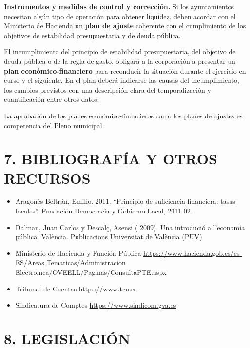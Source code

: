 \documentclass[
]{article}
\begin{document}
\textbf{Instrumentos y medidas de control y corrección.} Si los
ayuntamientos necesitan algún tipo de operación para obtener liquidez,
deben acordar con el Ministerio de Hacienda un \textbf{plan de ajuste}
coherente con el cumplimiento de los objetivos de estabilidad
presupuestaria y de deuda pública.

El incumplimiento del principio de estabilidad presupuestaria, del
objetivo de deuda pública o de la regla de gasto, obligará a la
corporación a presentar un \textbf{plan económico-financiero} para
reconducir la situación durante el ejercicio en curso y el siguiente. En
el plan deberá indicarse las causas del incumplimiento, los cambios
previstos con una descripción clara del temporalización y cuantificación
entre otros datos.

La aprobación de los planes económico-financieros como los planes de
ajustes es competencia del Pleno municipal.

\hypertarget{bibliografuxeda-y-otros-recursos}{%
\section{7. BIBLIOGRAFÍA Y OTROS
RECURSOS}\label{bibliografuxeda-y-otros-recursos}}

\begin{itemize}
\item
  Aragonés Beltrán, Emilio. 2011. ``Principio de suficiencia financiera:
  tasas locales''. Fundación Democracia y Gobierno Local, 2011-02.
\item
  Dalmau, Juan Carlos y Descalç, Asensi ( 2009). Una introdució a
  l'economía pública. València. Publicacions Universitat de València
  (PUV)
\item
  Ministerio de Hacienda y Función Pública
  \url{https://www.hacienda.gob.es/es-ES/Areas} Tematicas/Administracion
  Electronica/OVEELL/Paginas/ConsultaPTE.aspx
\item
  Tribunal de Cuentas \url{https://www.tcu.es}
\item
  Sindicatura de Comptes \url{https://www.sindicom.gva.es}
\end{itemize}

\hypertarget{legislaciuxf3n}{%
\section{8. LEGISLACIÓN}\label{legislaciuxf3n}}
\end{document}
